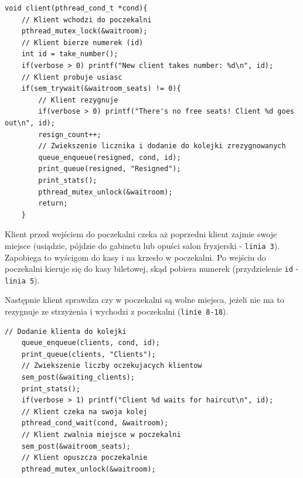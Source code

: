 \documentclass[12pt,a4paper]{article}
\begin{document}
	\begin{center}
		\begin{minipage}{0.82\linewidth}
\begin{lstlisting}[caption = Funkcja klienta 1/3.]
void client(pthread_cond_t *cond){
    // Klient wchodzi do poczekalni
    pthread_mutex_lock(&waitroom);
    // Klient bierze numerek (id)
    int id = take_number();
    if(verbose > 0) printf("New client takes number: %d\n", id);
    // Klient probuje usiasc
    if(sem_trywait(&waitroom_seats) != 0){
        // Klient rezygnuje
        if(verbose > 0) printf("There's no free seats! Client %d goes out\n", id);
        resign_count++;
        // Zwiekszenie licznika i dodanie do kolejki zrezygnowanych
        queue_enqueue(resigned, cond, id);
        print_queue(resigned, "Resigned");
        print_stats();
        pthread_mutex_unlock(&waitroom);
        return;
    }
\end{lstlisting}
		\end{minipage}
	\end{center}
	
	Klient przed wejściem do poczekalni czeka aż poprzedni klient
	zajmie swoje miejsce (usiądzie, pójdzie do gabinetu lub opuści salon
	fryzjerski - \texttt{linia 3}). Zapobiega to wyścigom do kasy i na
	krzesło w poczekalni. Po wejściu do poczekalni kieruje się do kasy 
	biletowej, skąd pobiera numerek (przydzielenie \texttt{id} -
	\texttt{linia 5}).
	
	Następnie klient sprawdza czy w poczekalni są wolne miejsca, jeżeli
	nie ma to rezygnuje ze strzyżenia i wychodzi z poczekalni
	(\texttt{linie 8-18}).
	
	\begin{center}
		\begin{minipage}{0.8\linewidth}
\begin{lstlisting}[caption = Funkcja klienta 2/3.]
// Dodanie klienta do kolejki
    queue_enqueue(clients, cond, id);
    print_queue(clients, "Clients");
    // Zwiekszenie liczby oczekujacych klientow
    sem_post(&waiting_clients);
    print_stats();
    if(verbose > 1) printf("Client %d waits for haircut\n", id);
    // Klient czeka na swoja kolej
    pthread_cond_wait(cond, &waitroom);
    // Klient zwalnia miejsce w poczekalni
    sem_post(&waitroom_seats);
    // Klient opuszcza poczekalnie
    pthread_mutex_unlock(&waitroom);
\end{lstlisting}
		\end{minipage}
	\end{center}
	
\end{document}
